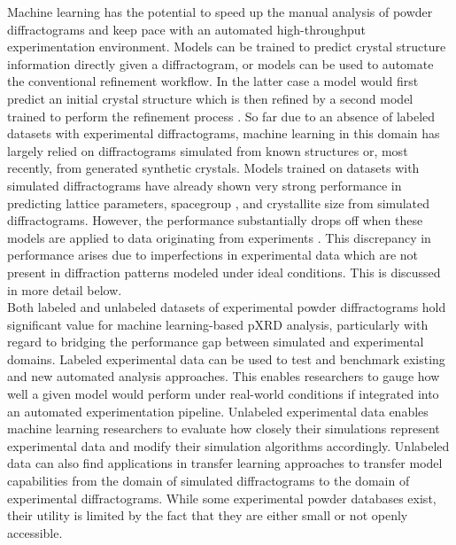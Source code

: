 Machine learning has the potential to speed up the manual analysis of powder diffractograms and keep pace with an automated high-throughput experimentation environment\cite{Agrawal2019, Surdu2023}.
Models can be trained to predict crystal structure information directly given a diffractogram, or models can be used to automate the conventional refinement workflow. In the latter case a model would first predict an initial crystal structure \cite{Surdu2023} which is then refined by a second model trained to perform the refinement process \cite{Feng2019}. So far due to an absence of labeled datasets with experimental diffractograms\cite{Wang2020}, machine learning in this domain has largely relied on diffractograms simulated from known structures\cite{Park2017, Lee2023} or, most recently, from generated synthetic crystals\cite{Schopmans2023}. 
Models trained on datasets with simulated diffractograms have already shown very strong performance in predicting lattice parameters\cite{Dong2021, Chitturi2021, Habershon2004, zhang2024crystallographic}, spacegroup \cite{cao2024simxrd, Schopmans2023, Oviedo2018, Park2017, Vecsei2018, Zaloga2020, Suzuki2020, Chakraborty2021,zhang2024crystallographic}, and crystallite size \cite{Dong2021, Chakraborty2021} from simulated diffractograms.
However, the performance substantially drops off when these models are applied to data originating from experiments \cite{cao2024simxrd, Schopmans2023,zhang2024crystallographic, Wang2020, Vecsei2018}. This discrepancy in performance arises due to imperfections in experimental data which are not present in diffraction patterns modeled under ideal conditions. This is discussed in more detail below. \\

Both labeled and unlabeled datasets of experimental powder diffractograms hold significant value for machine learning-based pXRD analysis, particularly with regard to bridging the performance gap between simulated and experimental domains. Labeled experimental data can be used to test and benchmark existing and new automated analysis approaches. This enables researchers to gauge how well a given model would perform under real-world conditions if integrated into an automated experimentation pipeline. Unlabeled experimental data enables machine learning researchers to evaluate how closely their simulations represent experimental data and modify their simulation algorithms accordingly. Unlabeled data can also find applications in transfer learning approaches to transfer model capabilities from the domain of simulated diffractograms to the domain of experimental diffractograms. While some experimental powder databases exist, their utility is limited by the fact that they are either small or not openly accessible. \\

